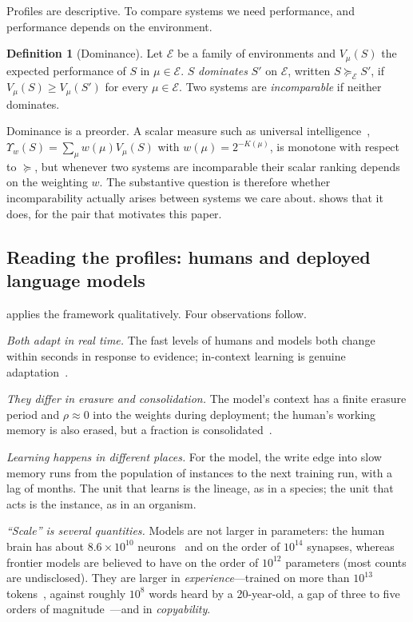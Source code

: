 \documentclass[11pt]{article}
\theoremstyle{plain}
\theoremstyle{definition}
\newtheorem{definition}{Definition}
\theoremstyle{remark}
\begin{document}
Profiles are descriptive. To compare systems we need performance, and performance depends on the environment.

\begin{definition}[Dominance]
\label{def:dominance}
Let $\mathcal{E}$ be a family of environments and $V_\mu(S)$ the expected performance of $S$ in $\mu\in\mathcal{E}$. $S$ \emph{dominates} $S'$ on $\mathcal{E}$, written $S\succeq_{\mathcal{E}}S'$, if $V_\mu(S)\ge V_\mu(S')$ for every $\mu\in\mathcal{E}$. Two systems are \emph{incomparable} if neither dominates.
\end{definition}

Dominance is a preorder. A scalar measure such as universal intelligence~\citep{legg2007universal}, $\Upsilon_w(S)=\sum_{\mu}w(\mu)V_\mu(S)$ with $w(\mu)=2^{-K(\mu)}$, is monotone with respect to $\succeq$, but whenever two systems are incomparable their scalar ranking depends on the weighting $w$. The substantive question is therefore whether incomparability actually arises between systems we care about.  shows that it does, for the pair that motivates this paper.

\subsection{Reading the profiles: humans and deployed language models}
\label{sec:reading}

 applies the framework qualitatively. Four observations follow.

\emph{Both adapt in real time.} The fast levels of humans and models both change within seconds in response to evidence; in-context learning is genuine adaptation~\citep{vonoswald2023transformers}.

\emph{They differ in erasure and consolidation.} The model's context has a finite erasure period and $\rho\approx0$ into the weights during deployment; the human's working memory is also erased, but a fraction is consolidated~\citep{mcclelland1995why,kumaran2016what}.

\emph{Learning happens in different places.} For the model, the write edge into slow memory runs from the population of instances to the next training run, with a lag of months. The unit that learns is the lineage, as in a species; the unit that acts is the instance, as in an organism.

\emph{``Scale'' is several quantities.} Models are not larger in parameters: the human brain has about $8.6\times10^{10}$ neurons~\citep{azevedo2009equal} and on the order of $10^{14}$ synapses, whereas frontier models are believed to have on the order of $10^{12}$ parameters (most counts are undisclosed). They are larger in \emph{experience}---trained on more than $10^{13}$ tokens~\citep{grattafiori2024llama}, against roughly $10^{8}$ words heard by a 20-year-old, a gap of three to five orders of magnitude~\citep{frank2023bridging}---and in \emph{copyability}.
\end{document}
